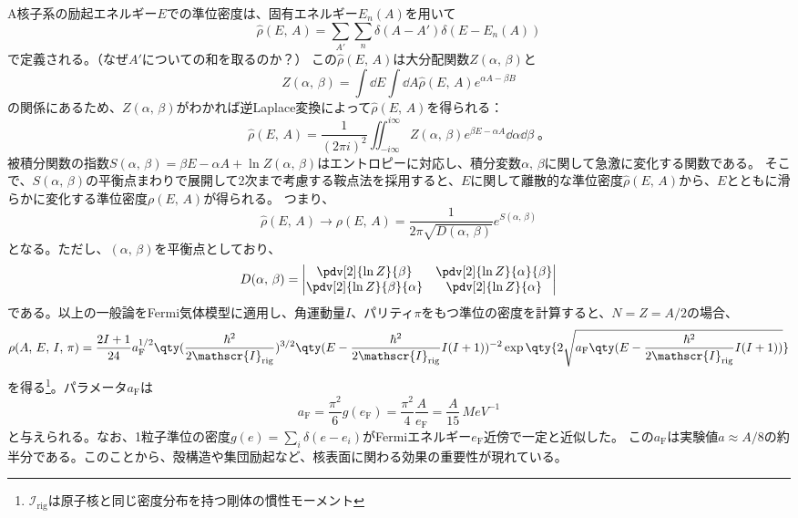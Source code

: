 \documentclass[a4paper,11pt,titlepage,uplatex]{jsarticle}
\begin{document}
A核子系の励起エネルギー$E$での準位密度は、固有エネルギー$E_n(A)$を用いて
\begin{equation}
	\hat\rho(E,\,A) = \sum_{A'}\sum_n\delta(A-A')\delta(E-E_n(A))
\end{equation}
で定義される。（なぜ$A'$についての和を取るのか？）
この$\hat{\rho}(E,\,A)$は大分配関数$Z(\alpha,\,\beta)$と
\begin{equation}
	Z(\alpha,\,\beta) = \int\dd{E}\int\dd{A}\hat{\rho}(E,\,A)e^{\alpha A-\beta B}
\end{equation}
の関係にあるため、$Z(\alpha,\,\beta)$がわかれば逆Laplace変換によって$\hat{\rho}(E,\,A)$を得られる：
\begin{equation}
	\hat{\rho}(E,\,A) = \frac{1}{(2\pi i)^2}\iint_{-i\infty}^{i\infty}Z(\alpha,\,\beta)e^{\beta E - \alpha A}\dd{\alpha}\dd{\beta}\;。
\end{equation}
被積分関数の指数$S(\alpha,\,\beta) = \beta E - \alpha A + \ln{Z(\alpha,\,\beta)}$はエントロピーに対応し、積分変数$\alpha,\,\beta$に関して急激に変化する関数である。
そこで、$S(\alpha,\,\beta)$の平衡点まわりで展開して2次まで考慮する鞍点法を採用すると、$E$に関して離散的な準位密度$\hat{\rho}(E,\,A)$から、$E$とともに滑らかに変化する準位密度${\rho}(E,\,A)$が得られる。
つまり、
\begin{equation}
	\hat{\rho}(E,\,A)\longrightarrow \rho(E,\,A) = \frac{1}{2\pi\sqrt{D(\alpha,\,\beta)}}e^{S(\alpha,\,\beta)}
\end{equation}
となる。ただし、$(\alpha,\,\beta)$を平衡点としており、
\begin{equation}
	D(\alpha,\,\beta) =
	\begin{vmatrix}
		\pdv[2]{\ln{Z}}{\beta}         & \pdv[2]{\ln{Z}}{\alpha}{\beta} \\
		\pdv[2]{\ln{Z}}{\beta}{\alpha} & \pdv[2]{\ln{Z}}{\alpha}
	\end{vmatrix}
\end{equation}
である。以上の一般論をFermi気体模型に適用し、角運動量$I$、パリティ$\pi$をもつ準位の密度を計算すると、$N=Z=A/2$の場合、
\begin{equation}
	\rho(A,\,E,\,I,\,\pi) =  \frac{2I+1}{24}a_{\text{F}}^{1/2}\qty(\frac{\hbar^2}{2\mathscr{I}_{\text{rig}}})^{3/2}\qty(E-\frac{\hbar^2}{2\mathscr{I}_{\text{rig}}} I(I+1))^{-2}
	\exp\qty{2\sqrt{a_{\text{F}}\qty(E-\frac{\hbar^2}{2\mathscr{I}_{\text{rig}}}I(I+1))}}
\end{equation}
を得る\footnote{$\mathscr{I}_{\text{rig}}$は原子核と同じ密度分布を持つ剛体の慣性モーメント}。パラメータ$a_{\text{F}}$は
\begin{equation}
	a_{\text{F}} = \frac{\pi^2}{6}g(e_{\text{F}}) = \frac{\pi^2}{4}\frac{A}{e_{\text{F}}} = \frac{A}{15}\,\si{MeV^{-1}}
\end{equation}
と与えられる。なお、1粒子準位の密度$g(e) = \sum_i\delta(e-e_i)$がFermiエネルギー$e_{\text{F}}$近傍で一定と近似した。
この$a_{\text{F}}$は実験値$a\approx A/8$の約半分である。このことから、殻構造や集団励起など、核表面に関わる効果の重要性が現れている。
\end{document}
